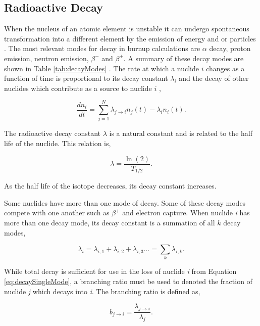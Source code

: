 \subsection{Radioactive Decay}
When the nucleus of an atomic element is unstable it can undergo spontaneous transformation into a different element by the emission of energy and or particles \cite{duderstadt1976}. The most relevant modes for decay in burnup calculations are $\alpha$ decay, proton emission, neutron emission, $\beta^{-}$ and $\beta^{+}$. A summary of these decay modes are shown in Table \ref{tab:decayModes} \cite{pusaThesis}. The rate at which a nuclide $i$ changes as a function of time is proportional to its decay constant $\lambda_{i}$ and the decay of other nuclides which contribute as a source to nuclide $i$  \cite{duderstadt1976}, 

\begin{equation}
    \frac{dn_{i}}{dt} = \sum_{j=1}^{N} \lambda_{j\rightarrow i}n_{j}(t) -\lambda_{i} n_{i}(t).
    \label{eq:decaySingleMode}
\end{equation}

\noindent The radioactive decay constant $\lambda$ is a natural constant and is related to the half life of the nuclide. This relation is,

\begin{equation}
    \lambda = \frac{\ln(2)}{T_{1/2}}.
\end{equation}

\noindent As the half life of the isotope decreases, its decay constant increases. 

Some nuclides have more than one mode of decay. Some of these decay modes compete with one another such as $\beta^{+}$ and electron capture. When nuclide \textit{i} has more than one decay mode, its decay constant is a summation of all $k$ decay modes,

\begin{equation}
    \lambda_{i} = \lambda_{i,1} + \lambda_{i,2} + \lambda_{i,3} ... = \sum_{k} \lambda_{i,k}.
\end{equation}

\noindent While total decay is sufficient for use in the loss of nuclide \textit{i} from Equation \ref{eq:decaySingleMode}, a branching ratio must be used to denoted the fraction of nuclide \textit{j} which decays into \textit{i}. The branching ratio is defined as,

\begin{equation}
    b_{j\rightarrow i} = \frac{\lambda_{j\rightarrow i}}{\lambda_{j}}.
\end{equation}

